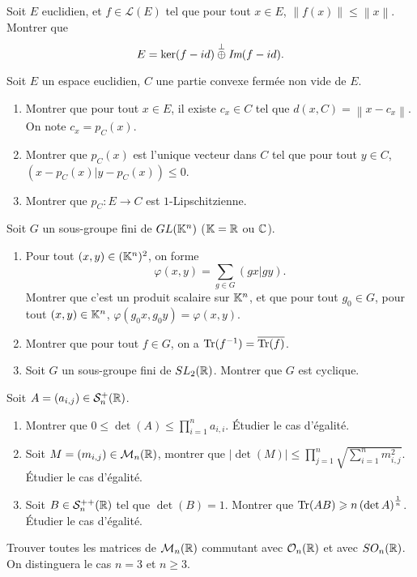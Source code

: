 \documentclass[12pt]{article}
\begin{document}
\begin{exercise}
	Soit $E$ euclidien, et $f\in\mathcal{L}(E)$ tel que pour tout $x\in E$, $\left\lVert f(x)\right\rVert\leqslant\left\lVert x\right\rVert$. Montrer que 
	\begin{equation}
		E=\ker(f-id)\overset{\perp}{\oplus}\emph{Im}(f-id).
	\end{equation}
\end{exercise}

\begin{exercise}
	Soit $E$ un espace euclidien, $C$ une partie convexe fermée non vide de $E$.
	\begin{enumerate}
		\item Montrer que pour tout $x\in E$, il existe $c_x\in C$ tel que $d(x,C)=\left\lVert x-c_x\right\rVert$. On note $c_x=p_{C}(x)$.
		\item Montrer que $p_{C}(x)$ est l'unique vecteur dans $C$ tel que pour tout $y\in C$, $(x-p_C(x)|y-p_C(x))\leqslant0$.
		\item Montrer que $p_C\colon E\to C$ est $1$-Lipschitzienne.
	\end{enumerate}
\end{exercise}

\begin{exercise}
	Soit $G$ un sous-groupe fini de $GL(\mathbb{K}^{n})$ ($\mathbb{K}=\mathbb{R}$ ou $\mathbb{C}$).
	\begin{enumerate}
		\item Pour tout $(x,y)\in(\mathbb{K}^{n})^{2}$, on forme 
		\begin{equation}
			\varphi(x,y)=\sum_{g\in G}(gx|gy).
		\end{equation}
		Montrer que c'est un produit scalaire sur $\mathbb{K}^{n}$, et que pour tout $g_0\in G$, pour tout $(x,y)\in \mathbb{K}^{n}$, $\varphi(g_0x,g_0y)=\varphi(x,y)$.
		\item Montrer que pour tout $f\in G$, on a $\operatorname{Tr}(f^{-1})=\overline{\operatorname{Tr}(f)}$.
		\item Soit $G$ un sous-groupe fini de $SL_{2}(\mathbb{R})$. Montrer que $G$ est cyclique.
	\end{enumerate}
\end{exercise}

\begin{exercise}
	Soit $A=(a_{i,j})\in \mathcal{S}_{n}^{+}(\mathbb{R})$.
	\begin{enumerate}
		\item Montrer que $0\leqslant\det(A)\leqslant\prod_{i=1}^{n}a_{i,i}$. Étudier le cas d'égalité.
		\item Soit $M=(m_{i,j})\in\mathcal{M}_{n}(\mathbb{R})$, montrer que $\left\lvert\det(M)\right\rvert\leqslant\prod_{j=1}^{n}\sqrt{\sum_{i=1}^{n}m_{i,j}^{2}}$. Étudier le cas d'égalité.
		\item Soit $B\in\mathcal{S}_{n}^{++}(\mathbb{R})$ tel que $\det(B)=1$. Montrer que $\operatorname{Tr}(AB)\geqslant n\left(\det A\right)^{\frac{1}{n}}$. Étudier le cas d'égalité.
	\end{enumerate}
\end{exercise}

\begin{exercise}
	Trouver toutes les matrices de $\mathcal{M}_n(\mathbb{R})$ commutant avec $\mathcal{O}_n(\mathbb{R})$ et avec $SO_n(\mathbb{R})$. On distinguera le cas $n=3$ et $n\geqslant3$.
\end{exercise}
\end{document}
